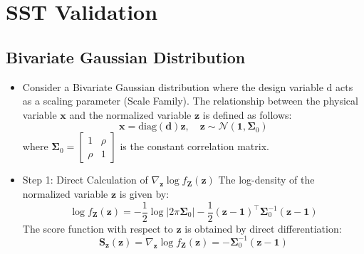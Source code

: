 \documentclass[12pt,a4paper, fleqn]{article}
\begin{document}
\section{SST Validation}

\subsection{Bivariate Gaussian Distribution}
\begin{itemize}
    \item
    Consider a Bivariate Gaussian distribution where the design variable $\mathrm{d}$ acts as a scaling parameter (Scale Family). The relationship between the physical variable $\mathrm{\mathbf{x}}$ and the normalized variable $\mathbf{z}$ is defined as follows:
    \begin{equation}
        \mathrm{\mathbf{x}} = \mathrm{diag}(\mathrm{\mathbf{d}}) \mathbf{z}, \quad \mathbf{z} \sim \mathcal{N}(\mathbf{1}, \boldsymbol{\Sigma}_0)
    \end{equation}
    where $\boldsymbol{\Sigma}_0 = \begin{bmatrix} 1 & \rho \\ \rho & 1 \end{bmatrix}$ is the constant correlation matrix.
\\

    \item Step 1: Direct Calculation of $\nabla_{\mathbf{z}} \log f_{\mathbf{Z}}(\mathbf{z})$
    The log-density of the normalized variable $\mathbf{z}$ is given by:
    \begin{equation}
        \log f_{\mathbf{Z}}(\mathbf{z}) = -\frac{1}{2} \log |2\pi \boldsymbol{\Sigma}_0| - \frac{1}{2}(\mathbf{z}-\mathbf{1})^\top \boldsymbol{\Sigma}_0^{-1} (\mathbf{z}-\mathbf{1})
    \end{equation}
    The score function with respect to $\mathbf{z}$ is obtained by direct differentiation:
    \begin{equation}
        \mathbf{S}_{\mathbf{z}}(\mathbf{z}) = \nabla_{\mathbf{z}} \log f_{\mathbf{Z}}(\mathbf{z}) = -\boldsymbol{\Sigma}_0^{-1}(\mathbf{z}-\mathbf{1})
    \end{equation}
\\


\end{itemize}
\end{document}
